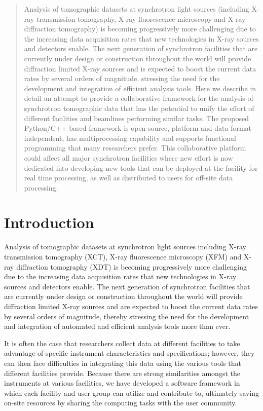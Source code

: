 \documentclass[pdf]{iucr}              %
\begin{document}
\begin{abstract}
Analysis of tomographic datasets at synchrotron light sources (including X-ray transmission tomography, X-ray fluorescence microscopy and X-ray diffraction tomography) is becoming progressively more challenging due to the increasing data acquisition rates that new technologies in X-ray sources and detectors enable. The next generation of synchrotron facilities that are currently under design or construction throughout the world will provide diffraction limited X-ray sources and is expected to boost the current data rates by several orders of magnitude, stressing the need for the development and integration of efficient analysis tools. Here we describe in detail an attempt to provide a collaborative framework for the analysis of synchrotron tomographic data that has the potential to unify the effort of different facilities and beamlines performing similar tasks. The proposed Python/C++ based framework is open-source, platform and data format independent, has multiprocessing capability and supports functional programming that many researchers prefer. This collaborative platform could affect all major synchrotron facilities where new effort is now dedicated into developing new tools that can be deployed at the facility for real time processing, as well as distributed to users for off-site data processing.
\end{abstract}


\section{Introduction}

Analysis of tomographic datasets at synchrotron light sources including X-ray transmission tomography (XCT), X-ray fluorescence microscopy (XFM) and X-ray diffraction tomography (XDT) is becoming progressively more challenging  due to the increasing data acquisition rates that new technologies in X-ray sources and detectors enable. The next generation of synchrotron facilities that are currently under design or construction throughout the world will provide diffraction limited X-ray sources and are expected to boost the current data rates by several orders of magnitude, thereby stressing the need for the development and integration of automated and efficient analysis tools more than ever. 

It is often the case that researchers collect data at different facilities to take advantage of specific instrument characteristics and specifications; however, they can then face difficulties in integrating this data using the various tools that different facilities provide. Because there are strong similarities amongst the instruments at various facilities, we have developed a software framework in which each facility and user group can utilize and contribute to, ultimately saving on-site resources by sharing the computing tasks with the user community. 
\end{document}
